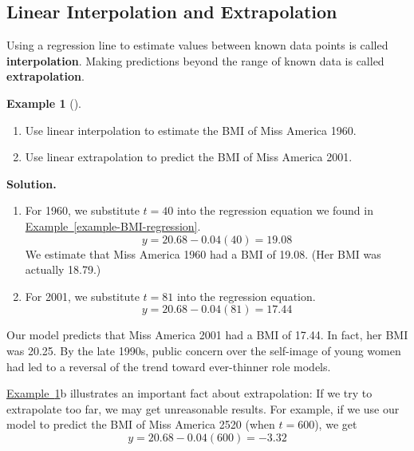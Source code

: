 \documentclass[10pt,]{book}
\newcommand{\terminology}[1]{\textbf{#1}}
\theoremstyle{plain}
\theoremstyle{definition}
\theoremstyle{definition}
\newtheorem{example}[theorem]{Example}
\theoremstyle{definition}
\theoremstyle{definition}
\numberwithin{equation}{part}
\begin{document}
\subsection[{Linear Interpolation and Extrapolation}]{Linear Interpolation and Extrapolation}\label{subsection-36}
Using a regression line to estimate values between known data points is called \terminology{interpolation}. Making predictions beyond the range of known data is called \terminology{extrapolation}.%
\begin{example}[]\label{example-BMI-extrapolation}
\leavevmode%
\begin{enumerate}[label=*\alph**]
\item\hypertarget{li-1320}{}Use linear interpolation to estimate the BMI of Miss America 1960.%
\item\hypertarget{li-1321}{}Use linear extrapolation to predict the BMI of Miss America 2001.%
\end{enumerate}
%
\par\medskip\noindent%
\textbf{Solution.}\quad \leavevmode%
\begin{enumerate}[label=*\alph**]
\item\hypertarget{li-1322}{}For 1960, we substitute \(t = 40\) into the regression equation we found in \hyperref[example-BMI-regression]{Example~\ref{example-BMI-regression}}.%
\begin{equation*}
y = 20.68 - 0.04(40) = 19.08
\end{equation*}
We estimate that Miss America 1960 had a BMI of 19.08. (Her BMI was actually 18.79.)%
\item\hypertarget{li-1323}{}For 2001, we substitute \(t = 81\) into the regression equation.%
\begin{equation*}
y = 20.68 - 0.04(81) = 17.44
\end{equation*}
%
\end{enumerate}
 Our model predicts that Miss America 2001 had a BMI of 17.44. In fact, her BMI was 20.25. By the late 1990s, public concern over the self-image of young women had led to a reversal of the trend toward ever-thinner role models.%
%
\end{example}
\hyperref[example-BMI-extrapolation]{Example~\ref{example-BMI-extrapolation}}b illustrates an important fact about extrapolation: If we try to extrapolate too far, we may get unreasonable results. For example, if we use our model to predict the BMI of Miss America 2520 (when \(t = 600\)), we get%
\begin{equation*}
y = 20.68 - 0.04(600) =-3.32
\end{equation*}
\end{document}
